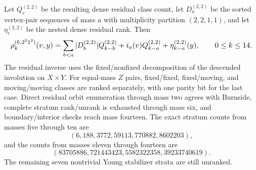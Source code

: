 \documentclass{article}
\newcommand{\fitmath}[1]{\resizebox{0.99\linewidth}{!}{$\displaystyle #1$}}
\begin{document}
Let $Q_r^{(2,2)}$ be the resulting dense residual class count, let
$D_a^{(2,2)}$ be the sorted vertex-pair sequences of mass $a$ with multiplicity
partition $(2,2,1,1)$, and let $\eta_r^{(2,2)}$ be the nested dense residual
rank. Then
\begin{equation}
  \fitmath{%
    \rho^{(6,2^2 1^2)}_k(v,y)
      =\sum_{b<a}|D_b^{(2,2)}|Q_{k-b}^{(2,2)}
       +i_a(v)Q_{k-a}^{(2,2)}+\eta_{k-a}^{(2,2)}(y),
    \qquad 0\leq k\leq14.
  }
  \label{eq:optimization-crazy-sextuple-s6-v4-vertex-ranking}
\end{equation}
The residual inverse uses the fixed/nonfixed decomposition of the descended
involution on $X\times Y$. For equal-mass $Z$ pairs, fixed/fixed, fixed/moving,
and moving/moving classes are ranked separately, with one parity bit for the
last case. Direct residual orbit enumeration through mass two agrees with
Burnside, complete stratum rank/unrank is exhausted through mass six, and
boundary/interior checks reach mass fourteen. The exact stratum counts from
masses five through ten are
\[
  (6,188,3772,59113,770882,8602203),
\]
and the counts from masses eleven through fourteen are
\[
  (83705886,721443423,5582322358,39233740619).
\]
The remaining seven nontrivial Young stabilizer strata are still unranked.
\end{document}
